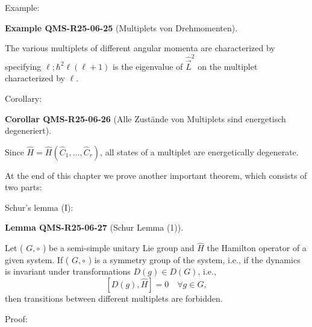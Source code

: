 \documentclass[10pt, letterpaper]{article}
\newcommand{\CustomHeading}[3]{%
  \par\medskip\noindent%
  \textbf{#1 #2} \textnormal{(#3)}.\enskip%
}
\newenvironment{LEM}[2]{\begin{unitbox}\CustomHeading{Lemma}{#1}{#2}}{\end{unitbox}}
\newenvironment{KORO}[2]{\begin{unitbox}\CustomHeading{Corollar}{#1}{#2}}{\end{unitbox}}
\newenvironment{EXA}[2]{\begin{unitbox}\CustomHeading{Example}{#1}{#2}}{\end{unitbox}}
\begin{document}
Example: 



\begin{EXA}{QMS-R25-06-25}{Multiplets von Drehmomenten}
The various multiplets of different angular momenta are characterized by specifying $\ell ; \hbar^{2} \ell(\ell+1)$ is the eigenvalue of $\hat{\vec{L}}^{2}$ on the multiplet characterized by $\ell$.
\end{EXA}


Corollary: 


\begin{KORO}{QMS-R25-06-26}{Alle Zustände von Multiplets sind energetisch degeneriert}
Since $\hat{H}=\hat{H}\left(\hat{C}_{1}, \ldots, \hat{C}_{r}\right)$, all states of a multiplet are energetically degenerate.
\end{KORO}

At the end of this chapter we prove another important theorem, which consists of two parts:


Schur's lemma (I): 


\begin{LEM}{QMS-R25-06-27}{Schur Lemma (1)}
Let ( $G, \circ$ ) be a semi-simple unitary Lie group and $\hat{H}$ the Hamilton operator of a given system. If ( $G, \circ$ ) is a symmetry group of the system, i.e., if the dynamics is invariant under transformations $D(g) \in D(G)$, i.e.,
$$
[D(g), \hat{H}]=0 \quad \forall g \in G,
$$
then transitions between different multiplets are forbidden.
\end{LEM}


Proof: 
\end{document}
